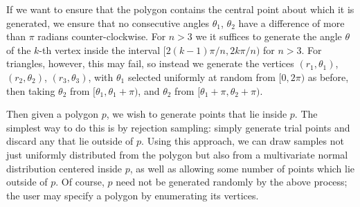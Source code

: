 \documentclass[manuscript,screen,review]{acmart}
\begin{document}
If we want to ensure that the polygon contains the central point about which it is generated, we
ensure that no consecutive angles $\theta_1$, $\theta_2$ have a difference of more than $\pi$ radians counter-clockwise.
For $n > 3$ we it suffices to generate the angle $\theta$ of the $k$-th vertex inside the interval
$[2(k-1)\pi / n, 2k\pi / n)$ for $n > 3$. For triangles, however, this may fail, so instead we generate the vertices
$(r_1, \theta_1)$, $(r_2, \theta_2)$, $(r_3, \theta_3)$, with $\theta_1$ selected uniformly at random from $[0, 2\pi)$ as before, then taking $\theta_2$ from $[\theta_1, \theta_1 + \pi)$, and $\theta_2$ from $[\theta_1 + \pi, \theta_2 + \pi)$.

Then given a polygon $p$, we wish to generate points that lie inside $p$. The simplest way to do this is by rejection
sampling: simply generate trial points and discard any that lie outside of $p$. Using this approach, we can draw
samples not just uniformly distributed from the polygon but also from a multivariate normal distribution centered
inside $p$, as well as allowing some number of points which lie outside of $p$. Of course, $p$ need not be generated randomly by the above process; the user may specify a polygon by enumerating its vertices.
\end{document}
